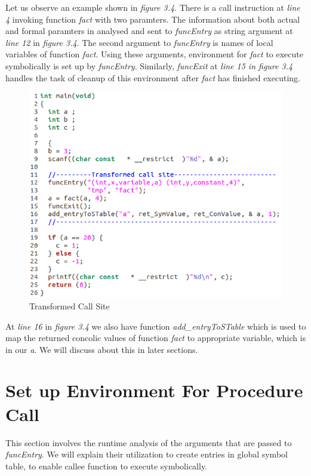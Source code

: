 \documentclass[12pt,oneside]{book}
\begin{document}
Let us observe an example shown in \textit{figure 3.4}. There is a call instruction at \textit{line 4} invoking function \textit{fact} with two paramters. The information about both actual and formal paramters in analysed and sent to \textit{funcEntry} as string argument at \textit{line 12} in \textit{figure 3.4}. The second argument to \textit{funcEntry} is names of local variables of function \textit{fact}. Using these arguments, environment for \textit{fact} to execute symbolically is set up by \textit{funcEntry}. Similarly, \textit{funcExit} at \textit{line 15 in figure 3.4} handles the task of cleanup of this environment after \textit{fact} has finished executing.

\vspace{0.4cm}
\begin{figure}[htbp]
\centering
\includegraphics[scale=0.56]{env2_modified.png}
\caption{Transformed Call Site}
\end{figure}  

At \textit{line 16} in \textit{figure 3.4} we also have function \textit{add\_entryToSTable} which is used to map the returned concolic values of function \textit{fact} to appropriate variable, which is in our \textit{a}. We will discuss about this in later sections. 

\newpage

\section{Set up Environment For Procedure Call}
This section involves the runtime analysis of the arguments that are passed to \textit{funcEntry}. We will explain their utilization to create entries in global symbol table, to enable callee function to execute symbolically.
\end{document}
